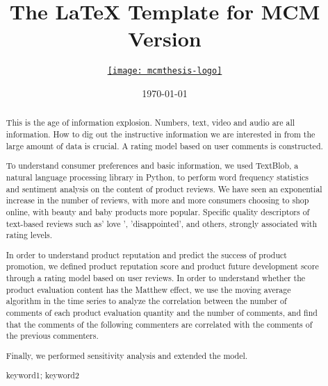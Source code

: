 \documentclass{mcmthesis}
\title{The \LaTeX{} Template for MCM Version \MCMversion}
\author{\small \href{http://www.latexstudio.net/}
  {\texttt{[image: mcmthesis-logo]}}}
\date{\today}
\begin{document}
\begin{abstract}
	This is the age of information explosion. Numbers, text, video and audio are all information. How to dig out the instructive information we are interested in from the large amount of data is crucial. A rating model based on user comments is constructed.
	
	To understand consumer preferences and basic information, we used TextBlob, a natural language processing library in Python, to perform word frequency statistics and sentiment analysis on the content of product reviews. We have seen an exponential increase in the number of reviews, with more and more consumers choosing to shop online, with beauty and baby products more popular. Specific quality descriptors of text-based reviews such as' love ', 'disappointed', and others, strongly associated with rating levels.
	
	In order to understand product reputation and predict the success of product promotion, we defined product reputation score and product future development score through a rating model based on user reviews. In order to understand whether the product evaluation content has the Matthew effect, we use the moving average algorithm in the time series to analyze the correlation between the number of comments of each product evaluation quantity and the number of comments, and find that the comments of the following commenters are correlated with the comments of the previous commenters.
	
	Finally, we performed sensitivity analysis and extended the model.
\begin{keywords}
keyword1; keyword2
\end{keywords}
\end{abstract}
\maketitle
\thispagestyle{empty}
\tableofcontents



\newpage
\setcounter{page}{1}
\end{document}
